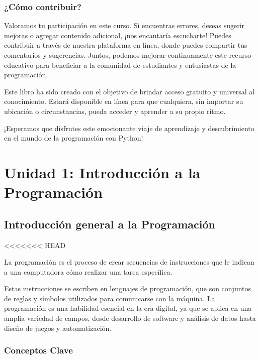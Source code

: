 \documentclass[
  a4paper,
  DIV=11,
  numbers=noendperiod,
  onepage,
  openany]{scrreprt}
\begin{document}
\hypertarget{cuxf3mo-contribuir}{%
\section{¿Cómo contribuir?}\label{cuxf3mo-contribuir}}

Valoramos tu participación en este curso. Si encuentras errores, deseas
sugerir mejoras o agregar contenido adicional, ¡nos encantaría
escucharte! Puedes contribuir a través de nuestra plataforma en línea,
donde puedes compartir tus comentarios y sugerencias. Juntos, podemos
mejorar continuamente este recurso educativo para beneficiar a la
comunidad de estudiantes y entusiastas de la programación.

Este libro ha sido creado con el objetivo de brindar acceso gratuito y
universal al conocimiento. Estará disponible en línea para que
cualquiera, sin importar su ubicación o circunstancias, pueda acceder y
aprender a su propio ritmo.

¡Esperamos que disfrutes este emocionante viaje de aprendizaje y
descubrimiento en el mundo de la programación con Python!

\part{Unidad 1: Introducción a la Programación}

\hypertarget{introducciuxf3n-general-a-la-programaciuxf3n}{%
\chapter{Introducción general a la
Programación}\label{introducciuxf3n-general-a-la-programaciuxf3n}}

\textless\textless\textless\textless\textless\textless\textless{} HEAD

La programación es el proceso de crear secuencias de instrucciones que
le indican a una computadora cómo realizar una tarea específica.

Estas instrucciones se escriben en lenguajes de programación, que son
conjuntos de reglas y símbolos utilizados para comunicarse con la
máquina. La programación es una habilidad esencial en la era digital, ya
que se aplica en una amplia variedad de campos, desde desarrollo de
software y análisis de datos hasta diseño de juegos y automatización.

\hypertarget{conceptos-clave}{%
\section{Conceptos Clave}\label{conceptos-clave}}
\end{document}
